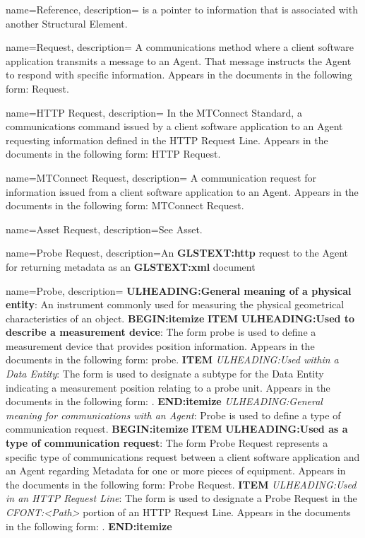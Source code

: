 {
    name={Reference},
	description={ is a pointer to information that is associated with another \gls{Structural Element}.}
}

{
    name={Request},
	description={
	A communications method where a client software application transmits a message to an \gls{Agent}.  That message instructs the \gls{Agent} to respond with specific information.
	Appears in the documents in the following form: \gls{Request}.
}
}

{
    name={HTTP Request},
	description={
	In the MTConnect Standard, a communications command issued by a client software application to an \gls{Agent} requesting information defined in the \gls{HTTP Request Line}.
	Appears in the documents in the following form: \gls{HTTP Request}.
}
}

{
    name={MTConnect Request},
	description={
	A communication request for information issued from a client software application to an \gls{Agent}.
	Appears in the documents in the following form: \gls{MTConnect Request}.
}
}

{
    name={Asset Request},
	description={See \gls{Asset}.}
}

{
    name={Probe Request},
	description={An \textbf{GLSTEXT:http} request to the \gls{Agent} for returning metadata as an  \textbf{GLSTEXT:xml} document}
}

{
    name={Probe},
	description={
	\textbf{ULHEADING:General meaning of a physical entity}:
	An instrument commonly used for measuring the physical geometrical characteristics of an object.
    \textbf{BEGIN:itemize}
	\textbf{ITEM} \textbf{ULHEADING:Used to describe a measurement device}:
	The form probe is used to define a measurement device that provides position information.
	Appears in the documents in the following form: probe. 
	\textbf{ITEM} \textit{ULHEADING:Used within a \gls{Data Entity}}:
	The form  is used to designate a subtype for the \gls{Data Entity}  indicating a measurement position relating to a probe unit.
	Appears in the documents in the following form: .
    \textbf{END:itemize}
	\textit{ULHEADING:General meaning for communications with an \gls{Agent}}:
	Probe is used to define a type of communication request. 
    \textbf{BEGIN:itemize}
	\textbf{ITEM} \textbf{ULHEADING:Used as a type of communication request}:
	The form \gls{Probe Request} represents a specific type of communications request between a client software application and an \gls{Agent} regarding \gls{Metadata} for one or more pieces of equipment.
	Appears in the documents in the following form: \gls{Probe Request}.
	\textbf{ITEM} \textit{ULHEADING:Used in an \gls{HTTP Request Line}}:
	The form  is used to designate a \gls{Probe Request} in the \textit{CFONT:<Path>} portion of an \gls{HTTP Request Line}.
	Appears in the documents in the following form: .
    \textbf{END:itemize}
}
}

